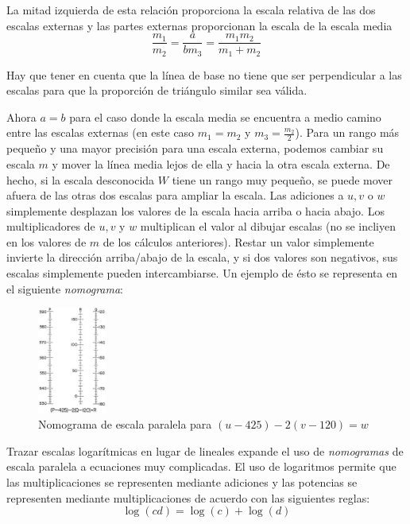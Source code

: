 \documentclass[letterpaper,11pt]{article}
\begin{document}
\begin{enumerate}
    La mitad izquierda de esta relación proporciona la escala relativa de las 
    dos escalas externas y las partes externas proporcionan la escala de la 
    escala media 
    \begin{equation*}
        \frac{m_{1}}{m_{2}} = \frac{a}{b m_{3}} = \frac{m_1 m_2}{m_1 + m_2}
    \end{equation*} 

    Hay que tener en cuenta que la línea de base no tiene que ser perpendicular
    a las escalas para que la proporción de triángulo similar sea válida. 

    Ahora $a = b$ para el caso donde la escala media se encuentra a medio camino
    entre las escalas externas (en este caso $m_1 = m_2$ y $m_3 = 
    \frac{m_2}{2}$). Para un rango más pequeño y una mayor precisión para una 
    escala externa, podemos cambiar su escala $m$ y mover la línea media lejos 
    de ella y hacia la otra escala externa. De hecho, si la escala desconocida 
    $W$ tiene un rango muy pequeño, se puede mover afuera de las otras dos 
    escalas para ampliar la escala. Las adiciones a $u, v$ o $w$ simplemente
    desplazan los valores de la escala hacia arriba o hacia abajo. Los 
    multiplicadores de $u, v$ y $w$ multiplican el valor al dibujar escalas (no 
    se incliyen en los valores de $m$ de los cálculos anteriores). Restar un 
    valor simplemente invierte la dirección arriba/abajo de la escala, y si dos 
    valores son negativos, sus escalas simplemente pueden intercambiarse. Un 
    ejemplo de ésto se representa en el siguiente \textit{nomograma}:
    \begin{figure}[htb]
        \centering
        \includegraphics[width=0.2\textwidth]{./imagenes/image004.jpg}
        \caption{Nomograma de escala paralela para $(u - 425) - 2(v - 120) = w$}
    \end{figure} 

    Trazar escalas logarítmicas en lugar de lineales expande el uso de 
    \textit{nomogramas} de escala paralela a ecuaciones muy complicadas. El uso
    de logaritmos permite que las multiplicaciones se representen mediante 
    adiciones y las potencias se representen mediante multiplicaciones de
    acuerdo con las siguientes reglas:
    \begin{equation*}
        \log (cd) = \log (c) + \log (d)
    \end{equation*}


\end{enumerate}
\end{document}
